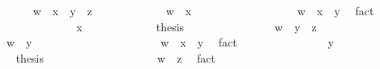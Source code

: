 \begin{isabellebody}
\ \ \ \ \isamarkupfalse%
\ {\isachardoublequoteopen}w\ {\isasymsqsubseteq}\ x\ {\isasymsqinter}\ {\isacharparenleft}y\ {\isasymsqinter}\ z{\isacharparenright}{\isachardoublequoteclose}\isanewline
\ \ \ \ \isamarkupfalse%
\isanewline
\ \ \ \ \ \ \isamarkupfalse%
\ {\isachardoublequoteopen}w\ {\isasymsqsubseteq}\ x{\isachardoublequoteclose}\isanewline
\ \ \ \ \ \ \isamarkupfalse%
\ {\isacharminus}\isanewline
\ \ \ \ \ \ \ \ \isamarkupfalse%
\ {\isachardoublequoteopen}w\ {\isasymsqsubseteq}\ x\ {\isasymsqinter}\ y{\isachardoublequoteclose}\ \isamarkupfalse%
\ fact\isanewline
\ \ \ \ \ \ \ \ \isamarkupfalse%
\ \isamarkupfalse%
\ {\isachardoublequoteopen}{\isasymdots}\ {\isasymsqsubseteq}\ x{\isachardoublequoteclose}\ \isacommand{{\isachardot}{\isachardot}}\isamarkupfalse%
\isanewline
\ \ \ \ \ \ \ \ \isamarkupfalse%
\ \isamarkupfalse%
\ {\isacharquery}thesis\ \isacommand{{\isachardot}}\isamarkupfalse%
\isanewline
\ \ \ \ \ \ \isamarkupfalse%
\isanewline
\ \ \ \ \ \ \isamarkupfalse%
\ {\isachardoublequoteopen}w\ {\isasymsqsubseteq}\ y\ {\isasymsqinter}\ z{\isachardoublequoteclose}\isanewline
\ \ \ \ \ \ \isamarkupfalse%
\isanewline
\ \ \ \ \ \ \ \ \isamarkupfalse%
\ {\isachardoublequoteopen}w\ {\isasymsqsubseteq}\ y{\isachardoublequoteclose}\isanewline
\ \ \ \ \ \ \ \ \isamarkupfalse%
\ {\isacharminus}\isanewline
\ \ \ \ \ \ \ \ \ \ \isamarkupfalse%
\ {\isachardoublequoteopen}w\ {\isasymsqsubseteq}\ x\ {\isasymsqinter}\ y{\isachardoublequoteclose}\ \isamarkupfalse%
\ fact\isanewline
\ \ \ \ \ \ \ \ \ \ \isamarkupfalse%
\ \isamarkupfalse%
\ {\isachardoublequoteopen}{\isasymdots}\ {\isasymsqsubseteq}\ y{\isachardoublequoteclose}\ \isacommand{{\isachardot}{\isachardot}}\isamarkupfalse%
\isanewline
\ \ \ \ \ \ \ \ \ \ \isamarkupfalse%
\ \isamarkupfalse%
\ {\isacharquery}thesis\ \isacommand{{\isachardot}}\isamarkupfalse%
\isanewline
\ \ \ \ \ \ \ \ \isamarkupfalse%
\isanewline
\ \ \ \ \ \ \ \ \isamarkupfalse%
\ {\isachardoublequoteopen}w\ {\isasymsqsubseteq}\ z{\isachardoublequoteclose}\ \isamarkupfalse%
\ fact\isanewline
\ \ \ \ \ \ \isamarkupfalse%
\isanewline
\ \ \ \ \isamarkupfalse%
\isanewline
\ \ \isamarkupfalse%

\end{isabellebody}
